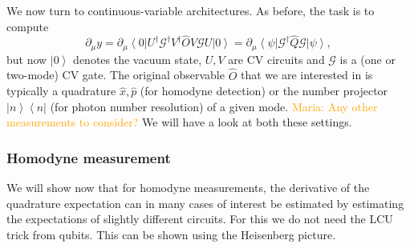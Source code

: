 \documentclass[aps,pra,10pt,twocolumn,groupedaddress,nofootinbib]{revtex4-1}
\theoremstyle{plain}
\newcommand{\ket}[1]{\ensuremath{\left| #1 \right \rangle}}
\newcommand{\bra}[1]{\ensuremath{\left \langle #1 \right |}}
\newcommand{\ketbra}[2]{\ket{#1}\bra{#2}}
\newcommand{\x}{\hat{x}}
\newcommand{\p}{\hat{p}}
\newcommand{\G}{\mathcal{G}}
\newcommand{\maria}[1]{\textcolor{orange}{Maria: #1}}
\begin{document}
We now turn to continuous-variable architectures. As before, the task is to compute 
\[\partial_{\mu}y = \partial_{\mu} \bra{0}U^{\dagger} \G^{\dagger} V^{\dagger} \hat{O}V \G U \ket{0} = \partial_{\mu} \bra{\psi} \G^{\dagger} \hat{Q} \G \ket{\psi},  \]
but now  $\ket{0}$ denotes the vacuum state, $U, V$ are CV circuits and $\G$ is a (one or two-mode) CV gate. The original observable $\hat{O}$ that we are interested in is typically a quadrature $\x, \p$ (for homodyne detection) or the number projector $\ketbra{n}{n}$ (for photon number resolution) of a given mode. \maria{Any other measurements to consider?} We will have a look at both these settings.


\subsubsection{Homodyne measurement}

We will show now that for homodyne measurements, the derivative of the quadrature expectation can in many cases of interest be estimated by estimating the expectations of slightly different circuits. For this we do not need the LCU trick from qubits. This can be shown using the Heisenberg picture. \\
\end{document}

